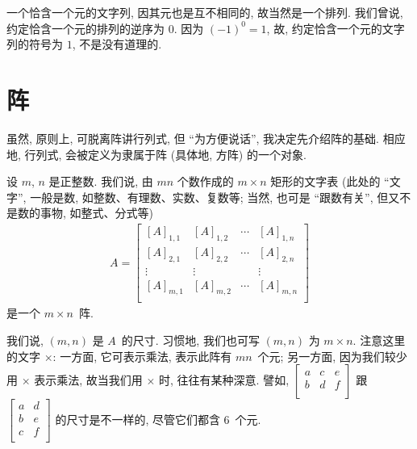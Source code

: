 \documentclass[%
    UTF8,%
    fontset=none,%
    punct=kaiming,%
    zihao=-4,%
    a4paper,%
    oneside,%
]{ctexbook}
\let\emph\relax
\begin{document}
一个恰含一个元的文字列, 因其元也是互不相同的,
故当然是一个排列.
我们曾说, 约定恰含一个元的排列的逆序为 \(0\).
因为 \((-1)^0 = 1\),
故, 约定恰含一个元的文字列的符号为 \(1\),
不是没有道理的.

\section{阵}

虽然, 原则上, 可脱离阵讲行列式, 但
``为方便说话'', 我决定先介绍阵的基础.
相应地, 行列式, 会被定义为隶属于阵
(具体地, 方阵)
的一个对象.

\begin{definition}[阵]
    设 \(m\), \(n\) 是正整数.
    我们说,
    由 \(mn\) 个数作成的 \(m \times n\) 矩形的文字表
    (此处的 ``文字'', 一般是数,
    如整数、有理数、实数、复数等;
    当然, 也可是 ``跟数有关'', 但又不是数的事物,
    如整式、分式等)
    \begin{align*}
        A =
        \begin{bmatrix}
            [A]_{1,1} & [A]_{1,2} & \cdots & [A]_{1,n} \\
            [A]_{2,1} & [A]_{2,2} & \cdots & [A]_{2,n} \\
            \vdots    & \vdots    & {}     & \vdots    \\
            [A]_{m,1} & [A]_{m,2} & \cdots & [A]_{m,n} \\
        \end{bmatrix}
    \end{align*}
    是一个 \(m \times n\)~阵.

    我们说, \emph{有序对} \((m, n)\) 是 \(A\)~的尺寸.
    习惯地, 我们也可写 \((m, n)\) 为 \(m \times n\).
    注意这里的文字 \(\times\):
    一方面, 它可表示乘法, 表示此阵有 \(mn\)~个元;
    另一方面, 因为我们较少用 \(\times\) 表示乘法,
    故当我们用 \(\times\) 时,
    往往有某种深意.
    譬如,
    \(
    \begin{bmatrix}
        a & c & e \\
        b & d & f \\
    \end{bmatrix}
    \)
    跟
    \(
    \begin{bmatrix}
        a & d \\
        b & e \\
        c & f \\
    \end{bmatrix}
    \)
    的尺寸是不一样的,
    尽管它们都含 \(6\)~个元.


\end{definition}
\end{document}
